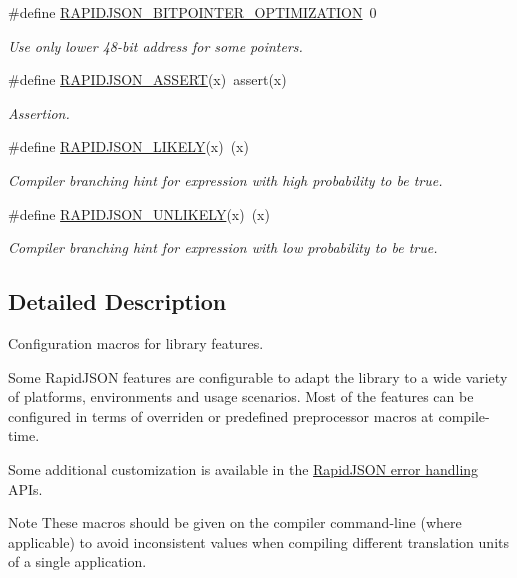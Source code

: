 \begin{DoxyCompactItemize}
\#define \hyperlink{group___r_a_p_i_d_j_s_o_n___c_o_n_f_i_g_ga93fb983f78208d12c822376e1ea6d185}{R\+A\+P\+I\+D\+J\+S\+O\+N\+\_\+B\+I\+T\+P\+O\+I\+N\+T\+E\+R\+\_\+\+O\+P\+T\+I\+M\+I\+Z\+A\+T\+I\+ON}~0
\begin{DoxyCompactList}\small\item\em Use only lower 48-\/bit address for some pointers. \end{DoxyCompactList}\item 
\#define \hyperlink{group___r_a_p_i_d_j_s_o_n___c_o_n_f_i_g_gabeba18d612187bad2ac62aed9276d47c}{R\+A\+P\+I\+D\+J\+S\+O\+N\+\_\+\+A\+S\+S\+E\+RT}(x)~assert(x)
\begin{DoxyCompactList}\small\item\em Assertion. \end{DoxyCompactList}\item 
\#define \hyperlink{group___r_a_p_i_d_j_s_o_n___c_o_n_f_i_g_ga5dc14176a9e71ace282404b0bcda57a1}{R\+A\+P\+I\+D\+J\+S\+O\+N\+\_\+\+L\+I\+K\+E\+LY}(x)~(x)
\begin{DoxyCompactList}\small\item\em Compiler branching hint for expression with high probability to be true. \end{DoxyCompactList}\item 
\#define \hyperlink{group___r_a_p_i_d_j_s_o_n___c_o_n_f_i_g_ga6a2b1695c13e77ae425e3cbac980ccb5}{R\+A\+P\+I\+D\+J\+S\+O\+N\+\_\+\+U\+N\+L\+I\+K\+E\+LY}(x)~(x)
\begin{DoxyCompactList}\small\item\em Compiler branching hint for expression with low probability to be true. \end{DoxyCompactList}\end{DoxyCompactItemize}


\subsection{Detailed Description}
Configuration macros for library features. 

Some Rapid\+J\+S\+ON features are configurable to adapt the library to a wide variety of platforms, environments and usage scenarios. Most of the features can be configured in terms of overriden or predefined preprocessor macros at compile-\/time.

Some additional customization is available in the \hyperlink{group___r_a_p_i_d_j_s_o_n___e_r_r_o_r_s}{Rapid\+J\+S\+ON error handling} A\+P\+Is.

\begin{DoxyNote}{Note}
These macros should be given on the compiler command-\/line (where applicable) to avoid inconsistent values when compiling different translation units of a single application. 
\end{DoxyNote}


